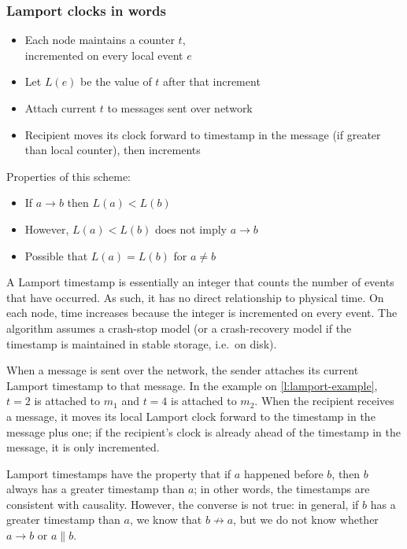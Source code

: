 \begin{frame}
    \label{s:lamport-description}
    \frametitle{Lamport clocks in words}
    \begin{itemize}
        \item Each node maintains a counter $t$,\\incremented on every local event $e$
        \item Let $L(e)$ be the value of $t$ after that increment
        \item Attach current $t$ to messages sent over network
        \item Recipient moves its clock forward to timestamp in the message (if greater than local counter), then increments\\[1em]
    \end{itemize}\pause
    Properties of this scheme:
    \begin{itemize}
        \item If $a \rightarrow b$ then $L(a) < L(b)$\pause
        \item However, $L(a) < L(b)$ does not imply $a \rightarrow b$\pause
        \item Possible that $L(a) = L(b)$ for $a \neq b$
    \end{itemize}
\end{frame}
\label{l:lamport-description}

A Lamport timestamp is essentially an integer that counts the number of events that have occurred.
As such, it has no direct relationship to physical time.
On each node, time increases because the integer is incremented on every event.
The algorithm assumes a crash-stop model (or a crash-recovery model if the timestamp is maintained in stable storage, i.e.\ on disk).

When a message is sent over the network, the sender attaches its current Lamport timestamp to that message.
In the example on \autoref{l:lamport-example}, $t=2$ is attached to $m_1$ and $t=4$ is attached to $m_2$.
When the recipient receives a message, it moves its local Lamport clock forward to the timestamp in the message plus one; if the recipient's clock is already ahead of the timestamp in the message, it is only incremented.

Lamport timestamps have the property that if $a$ happened before $b$, then $b$ always has a greater timestamp than $a$; in other words, the timestamps are consistent with causality.
However, the converse is not true: in general, if $b$ has a greater timestamp than $a$, we know that $b \not\rightarrow a$, but we do not know whether $a \rightarrow b$ or $a \parallel b$.

